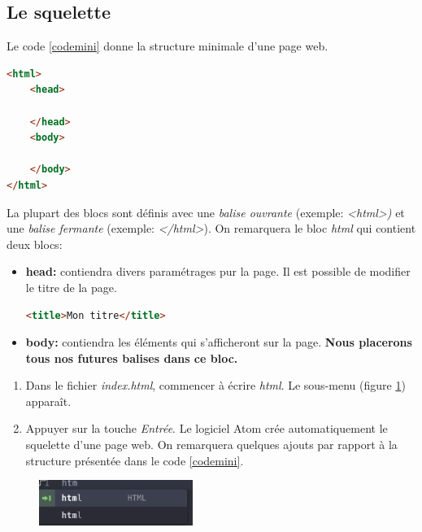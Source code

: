 \documentclass[a4paper,11pt]{article}
\begin{document}
\begin{Form}
\subsection{Le squelette}
Le code \ref{codemini} donne la structure minimale d'une page web.
\begin{code}[!h]
\begin{lstlisting}[language=html]
<html>
	<head>
	
	</head>
	<body>
	
	</body>
</html>
\end{lstlisting}
\label{codemini}
\end{code}

La plupart des blocs sont définis avec une \emph{balise ouvrante} (exemple: \emph{<html>)} et une \emph{balise fermante} (exemple: \emph{</html>}). On remarquera le bloc \emph{html} qui contient deux blocs:
\begin{itemize}
\item \textbf{head:} contiendra divers paramétrages pur la page. Il est possible de modifier le titre de la page.
\begin{lstlisting}[language=html]
<title>Mon titre</title>
\end{lstlisting}
\item \textbf{body:} contiendra les éléments qui s'afficheront sur la page. \textbf{Nous placerons tous nos futures balises dans ce bloc.}
\end{itemize}
\begin{activite}
\begin{enumerate}
\item Dans le fichier \emph{index.html}, commencer à écrire \emph{html}. Le sous-menu (figure \ref{html}) apparaît.
\item Appuyer sur la touche \emph{Entrée}. Le logiciel Atom crée automatiquement le squelette d'une page web. On remarquera quelques ajouts par rapport à la structure présentée dans le code \ref{codemini}.
\end{enumerate}
\end{activite}
\begin{figure}[!h]
\centering
\includegraphics[width=5cm]{ressources/html.png}
\label{html}
\end{figure}



\end{Form}
\end{document}
